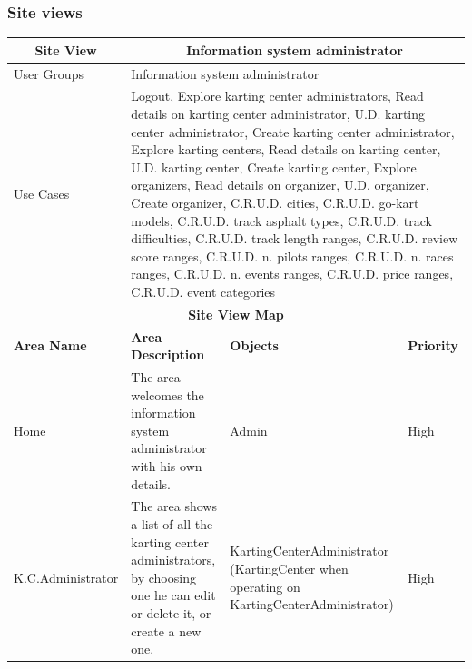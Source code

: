 \documentclass{beamer}
\begin{document}
\begin{frame}
    \frametitle{Site views}
    \begin{table}
        \centering
        \tiny
        \setlength{\tabcolsep}{1pt}
        \begin{tabular}{|m{2cm}|m{4cm}|m{3cm}|m{1cm}|}
        \hline
        \multicolumn{1}{|c|}{\textbf{Site View}} & \multicolumn{3}{c|}{\textbf{Information system administrator}} \\
        \hline
        User Groups & \multicolumn{3}{m{8cm}|}{Information system administrator} \\
        \hline
        Use Cases & \multicolumn{3}{m{8cm}|}{Logout, Explore karting center administrators, 
        Read details on karting center administrator, U.D. karting center administrator, 
        Create karting center administrator, Explore karting centers, 
        Read details on karting center, U.D. karting center, Create karting center, 
        Explore organizers, Read details on organizer, U.D. organizer, Create organizer, 
        C.R.U.D. cities, C.R.U.D. go-kart models, C.R.U.D. track asphalt types, 
        C.R.U.D. track difficulties, C.R.U.D. track length ranges, C.R.U.D. review score ranges, 
        C.R.U.D. n. pilots ranges, C.R.U.D. n. races ranges, C.R.U.D. n. events ranges, 
        C.R.U.D. price ranges, C.R.U.D. event categories } \\
        \hline
        \multicolumn{4}{|c|}{\textbf{Site View Map}} \\
        \hline
        \textbf{Area Name} & \textbf{Area Description} & \textbf{Objects} & \textbf{Priority} \\
        \hline
        Home & The area welcomes the information system administrator with his own details.
         & Admin & High \\
        \hline
        K.C.Administrator & The area shows a list of all the karting center administrators,
        by choosing one he can edit or delete it, or create a new one.
         & KartingCenterAdministrator (KartingCenter when operating
        on KartingCenterAdministrator) & High \\
        \hline
        \end{tabular}
    \end{table}
\end{frame}
\end{document}
